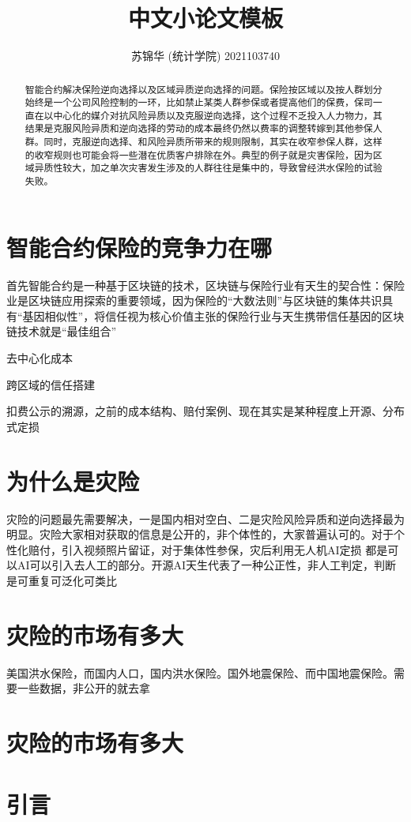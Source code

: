 \documentclass{ctexart}
\title{中文小论文模板}
\author{苏锦华  (统计学院) 2021103740}
\begin{document}
\maketitle

\begin{abstract}
      智能合约解决保险逆向选择以及区域异质逆向选择的问题。保险按区域以及按人群划分始终是一个公司风险控制的一环，比如禁止某类人群参保或者提高他们的保费，保司一直在以中心化的媒介对抗风险异质以及克服逆向选择，这个过程不乏投入人力物力，其结果是克服风险异质和逆向选择的劳动的成本最终仍然以费率的调整转嫁到其他参保人群。同时，克服逆向选择、和风险异质所带来的规则限制，其实在收窄参保人群，这样的收窄规则也可能会将一些潜在优质客户排除在外。典型的例子就是灾害保险，因为区域异质性较大，加之单次灾害发生涉及的人群往往是集中的，导致曾经洪水保险的试验失败。
\end{abstract}

\section{智能合约保险的竞争力在哪}

首先智能合约是一种基于区块链的技术，区块链与保险行业有天生的契合性：保险业是区块链应用探索的重要领域，因为保险的“大数法则”与区块链的集体共识具有“基因相似性”，将信任视为核心价值主张的保险行业与天生携带信任基因的区块链技术就是“最佳组合”

去中心化成本

跨区域的信任搭建

扣费公示的溯源，之前的成本结构、赔付案例、现在其实是某种程度上开源、分布式定损

\section{为什么是灾险}

灾险的问题最先需要解决，一是国内相对空白、二是灾险风险异质和逆向选择最为明显。灾险大家相对获取的信息是公开的，非个体性的，大家普遍认可的。对于个性化赔付，引入视频照片留证，对于集体性参保，灾后利用无人机AI定损 都是可以AI可以引入去人工的部分。开源AI天生代表了一种公正性，非人工判定，判断是可重复可泛化可类比

\section{灾险的市场有多大}

美国洪水保险，而国内人口，国内洪水保险。国外地震保险、而中国地震保险。需要一些数据，非公开的就去拿

\section{灾险的市场有多大}



\section{引言}







\end{document}
